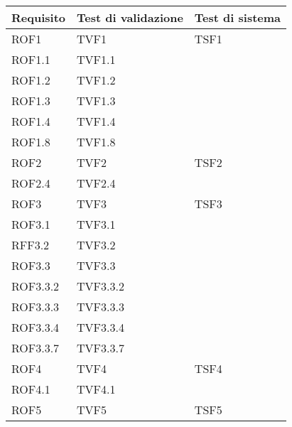 \begin{center}

\def\arraystretch{1.5}
\bgroup
\begin{longtable}{| p{4cm} | p{4cm} | p{4cm} |}

	\hline
	\textbf{Requisito} & \textbf{Test di validazione} &  \textbf{Test di sistema} \\
	\hline


	ROF1  & TVF1 & TSF1 \\
	\hline
	\hspace{2 mm} ROF1.1  & TVF1.1 &  \\
	\hline
	\hspace{2 mm} ROF1.2  & TVF1.2 &  \\
	\hline
	\hspace{2 mm} ROF1.3  & TVF1.3 &  \\
	\hline
	\hspace{2 mm} ROF1.4  & TVF1.4 &  \\
	\hline
	\hspace{2 mm} ROF1.8  & TVF1.8 &  \\
	\hline
	ROF2  & TVF2 & TSF2 \\
	\hline
	\hspace{2 mm} ROF2.4  & TVF2.4 &  \\
	\hline
	ROF3  & TVF3 & TSF3 \\
	\hline
	\hspace{2 mm} ROF3.1  & TVF3.1 &  \\
	\hline
	\hspace{2 mm} RFF3.2  & TVF3.2 &  \\
	\hline
	\hspace{2 mm} ROF3.3  & TVF3.3 &  \\
	\hline
	\hspace{4 mm} ROF3.3.2  & TVF3.3.2 &  \\
	\hline
	\hspace{4 mm} ROF3.3.3  & TVF3.3.3 &  \\
	\hline
	\hspace{4 mm} ROF3.3.4  & TVF3.3.4 &  \\
	\hline
	\hspace{4 mm} ROF3.3.7  & TVF3.3.7 &  \\
	\hline
	ROF4  & TVF4 & TSF4 \\
	\hline
	\hspace{2 mm} ROF4.1  & TVF4.1 &  \\
	\hline
	ROF5  & TVF5 & TSF5 \\

\end{longtable}
\end{center}
